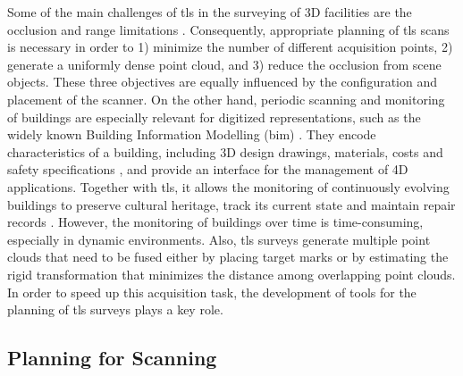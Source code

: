 Some of the main challenges of \acrshort{tls} in the surveying of 3D facilities are the occlusion and range limitations \cite{soudarissanane_optimizing_2012}. Consequently, appropriate planning of \acrshort{tls} scans is necessary in order to 1) minimize the number of different acquisition points, 2) generate a uniformly dense point cloud, and 3) reduce the occlusion from scene objects. These three objectives are equally influenced by the configuration and placement of the scanner. On the other hand, periodic scanning and monitoring of buildings are especially relevant for digitized representations, such as the widely known Building Information Modelling (\acrshort{bim}) \cite{macher_point_2017}. They encode characteristics of a building, including 3D design drawings, materials, costs and safety specifications \cite{patraucean_state_2015}, and provide an interface for the management of 4D applications. Together with \acrshort{tls}, it allows the monitoring of continuously evolving buildings to preserve cultural heritage, track its current state and maintain repair records \cite{rocha_scan--bim_2020, andriasyan_point_2020, moyano_bringing_2020, ham_phased_2020}. However, the monitoring of buildings over time is time-consuming, especially in dynamic environments. Also, \acrshort{tls} surveys generate multiple point clouds that need to be fused either by placing target marks \cite{gollob_comparison_2020} or by estimating the rigid transformation that minimizes the distance among overlapping point clouds. In order to speed up this acquisition task, the development of tools for the planning of \acrshort{tls} surveys plays a key role.

\subsection{Planning for Scanning}

